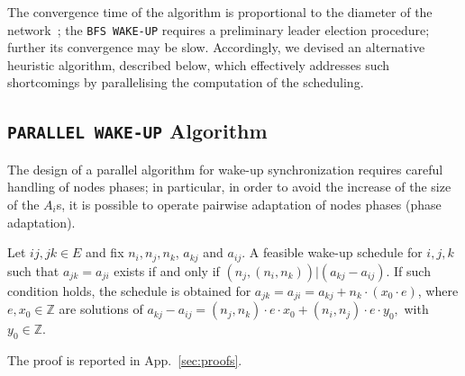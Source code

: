 The convergence time of the algorithm is proportional to the diameter of the network~\cite{Cormen};
 the {\tt BFS WAKE-UP} requires a preliminary leader election procedure; further its convergence 
may be slow. Accordingly, we devised an alternative heuristic algorithm, described below, which effectively addresses
such shortcomings by parallelising the computation of the scheduling.


\subsection{{\tt PARALLEL WAKE-UP} Algorithm}\label{sec:parallel}


The design of a parallel algorithm for wake-up synchronization requires careful handling of 
nodes phases; in particular, in order to avoid the increase of the size of the $A_i$s, it is 
possible to operate pairwise adaptation of nodes phases (phase adaptation).

\begin{lem}\label{prop:adjphase}
Let $ij,jk\in E$ and fix $n_i,n_j,n_k$, $a_{kj}$ and $a_{ij}$. A feasible wake-up schedule for $i,j,k$ 
such that $a_{jk}=a_{ji}$ exists if and only if
$(n_j,(n_i,n_k))|(a_{kj} - a_{ij})$. If such condition holds, the schedule is obtained for $a_{jk}=a_{ji} = a_{kj}+n_k \cdot (x_0\cdot e)$,  
where $e, x_0 \in \mathbb{Z}$ are solutions of $a_{kj}-a_{ij}= (n_j,n_k)\cdot e \cdot x_0 + (n_i,n_j)\cdot e
\cdot y_0,$ with $y_0 \in \mathbb{Z}$.
\end{lem}The proof is reported in App.~\ref{sec:proofs}.



